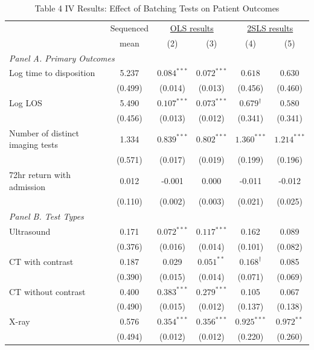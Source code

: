 \documentclass[11pt]{article}
\newcommand{\1}{\hbox{\rm 1\kern-.35em 1}}
\begin{document}
\begin{table}[H]
\centering
\caption*{Table 4     IV Results: Effect of Batching Tests on Patient Outcomes}
\label{tab:results_table}
\begin{threeparttable}
\begin{tabular}{lccccc}
\toprule
& Sequenced & \multicolumn{2}{c}{\underline{OLS results}} & \multicolumn{2}{c}{\underline{2SLS results}} \\
& mean & (2) & (3) & (4) & (5) \\
\midrule
\multicolumn{6}{l}{\textit{Panel A. Primary Outcomes}} \\[0.5em]
Log time to disposition & 5.237 & $0.084^{***}$ & $0.072^{***}$ & $0.618$ & $0.630$ \\
& (0.499) & (0.014) & (0.013) & (0.456) & (0.460) \\[0.5em]
Log LOS & 5.490 & $0.107^{***}$ & $0.073^{***}$ & $0.679^{\dagger}$ & $0.580$ \\
& (0.456) & (0.013) & (0.012) & (0.341) & (0.341) \\[0.5em]
Number of distinct imaging tests & 1.334 & $0.839^{***}$ & $0.802^{***}$ & $1.360^{***}$ & $1.214^{***}$ \\
& (0.571) & (0.017) & (0.019) & (0.199) & (0.196) \\[0.5em]
72hr return with admission & 0.012 & -0.001 & 0.000 & -0.011 & -0.012 \\
& (0.110) & (0.002) & (0.003) & (0.021) & (0.025) \\[0.5em]

\multicolumn{6}{l}{\textit{Panel B. Test Types}} \\[0.5em]
Ultrasound & 0.171 & $0.072^{***}$ & $0.117^{***}$ & 0.162 & 0.089 \\
& (0.376) & (0.016) & (0.014) & (0.101) & (0.082) \\[0.5em]
CT with contrast & 0.187 & 0.029 & $0.051^{**}$ & $0.168^{\dagger}$ & 0.085 \\
& (0.390) & (0.015) & (0.014) & (0.071) & (0.069) \\[0.5em]
CT without contrast & 0.400 & $0.383^{***}$ & $0.279^{***}$ & 0.105 & 0.067 \\
& (0.490) & (0.015) & (0.012) & (0.137) & (0.138) \\[0.5em]
X-ray & 0.576 & $0.354^{***}$ & $0.356^{***}$ & $0.925^{***}$ & $0.972^{**}$ \\
& (0.494) & (0.012) & (0.012) & (0.220) & (0.260) \\[0.5em]


\end{tabular}
\end{threeparttable}
\end{table}
\end{document}
